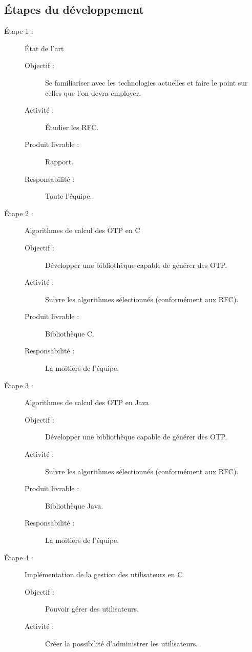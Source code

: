 \documentclass{../../res/univ-projet}
\begin{document}
\subsection{Étapes du développement}
	\begin{description}
		\item [Étape 1 :] État de l'art
			\begin{description}
		    	\item [Objectif :] Se familiariser avec les technologies actuelles et faire le point sur celles que l'on devra employer.
		        \item [Activité :] Étudier les RFC.
		        \item [Produit livrable :] Rapport.
		        \item [Responsabilité :] Toute l'équipe.
            \end{description}
	    \item [Étape 2 :] Algorithmes de calcul des OTP en C
		    \begin{description}
		        \item [Objectif :] Développer une bibliothèque capable de générer des OTP.
		        \item [Activité :] Suivre les algorithmes sélectionnés (conformément aux RFC).
		        \item [Produit livrable :] Bibliothèque C.
		        \item [Responsabilité :] La moitiers de l'équipe.
		    \end{description}
	    \item [Étape 3 :] Algorithmes de calcul des OTP en Java
		    \begin{description}
		        \item [Objectif :] Développer une bibliothèque capable de générer des OTP.
		        \item [Activité :] Suivre les algorithmes sélectionnés (conformément aux RFC).
		        \item [Produit livrable :] Bibliothèque Java.
		        \item [Responsabilité :] La moitiers de l'équipe.
		    \end{description}
	    \item [Étape 4 :] Implémentation de la gestion des utilisateurs en C
		    \begin{description}
		        \item [Objectif :] Pouvoir gérer des utilisateurs.
		        \item [Activité :] Créer la possibilité d'administrer les utilisateurs.

\end{description}
\end{description}
\end{document}
